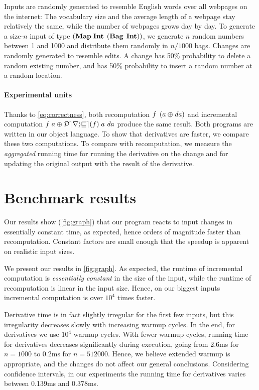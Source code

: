 Inputs are randomly generated to resemble English words over all
webpages on the internet: The vocabulary size and the average
length of a webpage stay relatively the same, while the number of
webpages grows day by day. To generate a size-$n$ input of type
$(\HashMap{\Int}{\Bag*[\Int]})$, we generate $n$ random numbers
between 1 and 1000 and distribute them randomly in $n/1000$ bags.
Changes are randomly generated to resemble edits. A change has
50\% probability to delete a random existing number, and has 50\%
probability to insert a random number at a random location.

\paragraph{Experimental units}

Thanks to \cref{eq:correctness}, both recomputation
$\App{f}{\Apply*{\D a}{a}}$ and incremental computation
$\Apply{\App{\App{\Derive{f}}{a}}{\D a}}{\App{f}{a}}$ produce
the same result. Both programs are written in our object language.
To show that derivatives are faster, we compare
these two computations. To compare with recomputation, we measure the
\emph{aggregated} running time for running the derivative on the change
and for updating the original output with the result of the derivative.

\section{Benchmark results}

Our results show (\cref{fig:graph}) that our program reacts to input changes
in essentially constant time, as expected, hence orders of magnitude faster than
recomputation. Constant factors are small enough that the speedup is apparent on realistic input sizes.


We present our results in \cref{fig:graph}. As expected, the
runtime of incremental computation is
\emph{essentially constant} in the size of the input, while the runtime
of recomputation is linear in the input size.
Hence, on our biggest inputs incremental computation
is over $10^4$ times faster.

Derivative time is in fact slightly irregular for the first few inputs,
but this irregularity decreases slowly with increasing warmup
cycles. In the end, for derivatives we use $10^4$ warmup cycles.
With fewer warmup cycles, running time for derivatives decreases
significantly during execution, going from 2.6ms for $n = 1000$ to
0.2ms for $n = 512000$. Hence, we believe extended warmup is
appropriate, and the changes do not affect our general
conclusions. Considering confidence intervals, in our experiments the running
time for derivatives varies between 0.139ms and 0.378ms.

